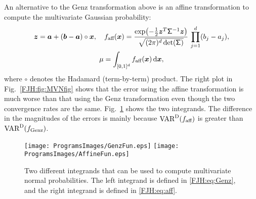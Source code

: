 \documentclass[graybox,footinfo]{svmult}
\begin{document}
\begin{FJHLesson}
\FJHLessonThree
\end{FJHLesson}

\begin{FJHLesson}
	\FJHLessonSeven
\end{FJHLesson}

An alternative to the Genz transformation above is an affine transformation to compute 
the multivariate Gaussian probability:
\begin{gather}
\label{FJH:eq:aff}
\bsz = \bsa + (\bsb-\bsa) \circ \bsx, \quad f_{\textup{aff}}(\bsx) =  \frac{\exp\bigl(- 
\frac 12 \bsz^T
\mathsf{\Sigma}^{-1} \bsz 
	\bigr)}{\sqrt{(2 \pi)^d \det(\mathsf{\Sigma})}} \, \prod_{j=1}^d (b_j - a_j), \\
\nonumber
\mu = 
	\int_{[0,1]^{d}} f_{\textup{aff}}(\bsx) \, \D \bsx,
\end{gather} 
where $\circ$ denotes the Hadamard (term-by-term) product.  The right plot in Fig.\ 
\ref{FJH:fig:MVNfig} shows that the error using the affine 
transformation is much worse than that using the Genz transformation even though the 
two convergence rates are the same.  Fig.\ \ref{FJH:fig:GenzAff} shows the two 
integrands.  The difference in the magnitudes of the errors is 
mainly because $\textup{VAR}^{\textup{D}}(f_{\textup{aff}})$ is greater than 
$\textup{VAR}^{\textup{D}}(f_{\textup{Genz}})$.


\begin{figure}
	\centering
	\texttt{[image: ProgramsImages/GenzFun.eps]} \qquad 
	\texttt{[image: ProgramsImages/AffineFun.eps]}
	\caption{Two different integrands that can be used to compute multivariate normal 
	probabilities.  The left integrand is defined in \eqref{FJH:eq:Genz}, and the right 
	integrand is defined in  \eqref{FJH:eq:aff}.
		\label{FJH:fig:GenzAff}}
\end{figure}


\begin{FJHLesson} \label{FJH:eq:lessonfour}
	\FJHLessonFour
\end{FJHLesson}
\end{document}
